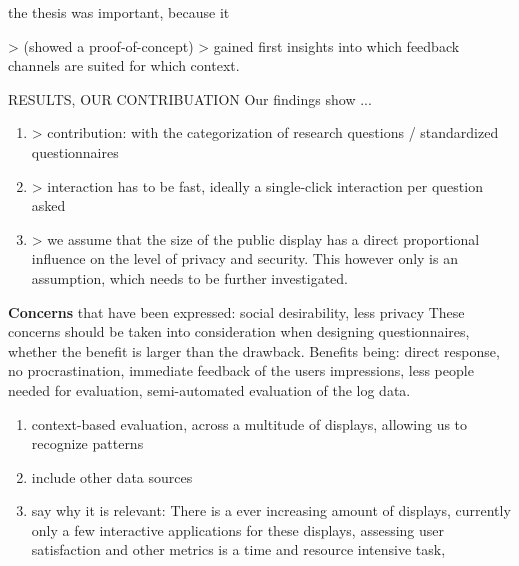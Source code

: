 
	the thesis was important, because it 

	> (showed a proof-of-concept)
	> gained first insights into which feedback channels are suited for which context.


	RESULTS, OUR CONTRIBUATION
	Our findings show ...
	\begin{enumerate}
	\item > contribution: with the categorization of research questions / standardized questionnaires
	\item > interaction has to be fast, ideally a single-click interaction per question asked
	\item > we assume that the size of the public display has a direct proportional influence on the level of privacy and security. This however only is an assumption, which needs to be further investigated.
	\end{enumerate}



	\textbf{Concerns} that have been expressed: social desirability, less privacy
	These concerns should be taken into consideration when designing questionnaires, whether the benefit is larger than the drawback. Benefits being: direct response, no procrastination, immediate feedback of the users impressions, less people needed for evaluation, semi-automated evaluation of the log data.




	\begin{enumerate}
	\item context-based evaluation, across a multitude of displays, allowing us to recognize patterns
	\item include other data sources
	\item say why it is relevant: There is a ever increasing amount of displays, currently only a few interactive applications for these displays, assessing user satisfaction and other metrics is a time and resource intensive task, 
	\end{enumerate}


